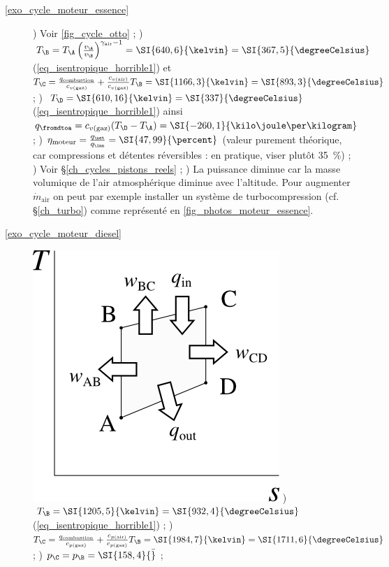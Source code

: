	\begin{description}
		\item [\ref{exo_cycle_moteur_essence}]
			) Voir \cref{fig_cycle_otto} ;
	 		) $T_\B = T_\A \left(\frac{v_\A}{v_\B}\right)^{\gamma_\text{air} - 1} = \SI{640,6}{\kelvin} = \SI{367,5}{\degreeCelsius}$ (\ref{eq_isentropique_horrible1}) et $T_\C = \frac{q_\text{combustion}}{c_{v \text{(gaz)}}} + \frac{c_{v \text{(air)}}}{c_{v \text{(gaz)}}} T_\B = \SI{1166,3}{\kelvin} = \SI{893,3}{\degreeCelsius}$ ;
	 		) $T_\D = \SI{610,16}{\kelvin} = \SI{337}{\degreeCelsius}$ (\ref{eq_isentropique_horrible1}) ainsi $q_\fromdtoa = c_{v \text{(gaz)}} (T_\D - T_\A) = \SI{-260,1}{\kilo\joule\per\kilogram}$ ;
	 		) $\eta_\text{moteur} = \frac{q_\net}{q_\inn} = \SI{47,99}{\percent}$ (valeur purement théorique, car compressions et détentes réversibles : en pratique, viser plutôt \SI{35}{\percent}) ;
	 		) Voir \S\ref{ch_cycles_pistons_reels} ;
	 		) La puissance diminue car la masse volumique de l’air atmosphérique diminue avec l’altitude. Pour augmenter $\dot m_\text{air}$ on peut par exemple installer un système de turbocompression (cf. \S\ref{ch_turbo}) comme représenté en \cref{fig_photos_moteur_essence}.
	 	\item [\ref{exo_cycle_moteur_diesel}]
	 		\includegraphics[width=\solutiondiagramwidth]{images/exo_sol_ts_diesel.png}
	 		) $T_\B = \SI{1205,5}{\kelvin} = \SI{932,4}{\degreeCelsius}$ (\ref{eq_isentropique_horrible1}) ;
	 		) $T_\C = \frac{q_\text{combustion}}{c_{p \text{(gaz)}}} + \frac{c_{p \text{(air)}}}{c_{p \text{(gaz)}}} T_\B = \SI{1984,7}{\kelvin} = \SI{1711,6}{\degreeCelsius}$ ;
	 		) $p_\C = p_\B = \SI{158,4}{\bar}$ ;

\end{description}
